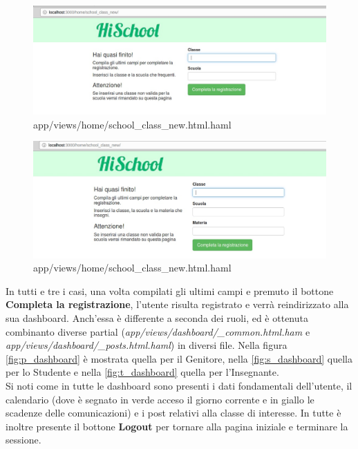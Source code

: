 \documentclass[Lau, binding=0.6cm, oneside]{sapthesis}
\begin{document}
\begin{figure}[H]
	\centering
	\includegraphics[width=1\linewidth]{images/school_s_form} 
	\caption{app/views/home/school\_class\_new.html.haml}
	\label{fig:school_s_form}
\end{figure}

\begin{figure}[H]
	\centering
	\includegraphics[width=1\linewidth]{images/school_t_form} 
	\caption{app/views/home/school\_class\_new.html.haml}
	\label{fig:school_t_form}
\end{figure}

In tutti e tre i casi, una volta compilati gli ultimi campi e premuto il bottone \textbf{Completa la registrazione}, l'utente risulta registrato e verrà reindirizzato alla sua dashboard. Anch'essa è differente a seconda dei ruoli, ed è ottenuta combinanto diverse partial (\textit{app/views/dashboard/\_common.html.ham} e \textit{app/views/dashboard/\_posts.html.haml}) in diversi file. Nella figura \ref{fig:p_dashboard} è mostrata quella per il Genitore, nella \ref{fig:s_dashboard} quella per lo Studente e nella \ref{fig:t_dashboard} quella per l'Insegnante.\\
Si noti come in tutte le dashboard sono presenti i dati fondamentali dell'utente, il calendario (dove è segnato in verde acceso il giorno corrente e in giallo le scadenze delle comunicazioni) e i post relativi alla classe di interesse. In tutte è inoltre presente il bottone \textbf{Logout} per tornare alla pagina iniziale e terminare la sessione.
\end{document}
